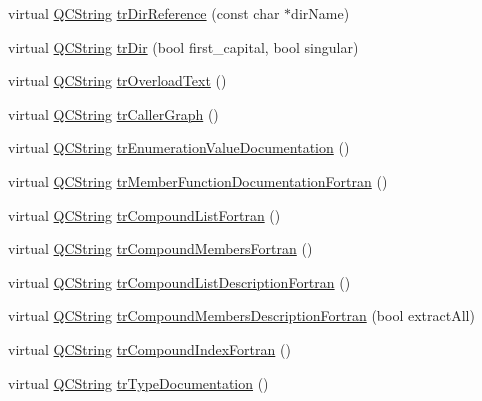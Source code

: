 \begin{DoxyCompactItemize}
\item 
virtual \mbox{\hyperlink{class_q_c_string}{Q\+C\+String}} \mbox{\hyperlink{class_translator_polish_a81612a5c664efbf969a754858f681160}{tr\+Dir\+Reference}} (const char $\ast$dir\+Name)
\item 
virtual \mbox{\hyperlink{class_q_c_string}{Q\+C\+String}} \mbox{\hyperlink{class_translator_polish_afb7f5a136927d3c97c329726db732650}{tr\+Dir}} (bool first\+\_\+capital, bool singular)
\item 
virtual \mbox{\hyperlink{class_q_c_string}{Q\+C\+String}} \mbox{\hyperlink{class_translator_polish_aa85a82b3a60d234fcb2c1b611a190a75}{tr\+Overload\+Text}} ()
\item 
virtual \mbox{\hyperlink{class_q_c_string}{Q\+C\+String}} \mbox{\hyperlink{class_translator_polish_aea28863a3d514eda308c9b6182a684a3}{tr\+Caller\+Graph}} ()
\item 
virtual \mbox{\hyperlink{class_q_c_string}{Q\+C\+String}} \mbox{\hyperlink{class_translator_polish_a4a1891d1aa67f42df654be0c805034f1}{tr\+Enumeration\+Value\+Documentation}} ()
\item 
virtual \mbox{\hyperlink{class_q_c_string}{Q\+C\+String}} \mbox{\hyperlink{class_translator_polish_ab10c6bb79b12175789a3e46fadd2e7a7}{tr\+Member\+Function\+Documentation\+Fortran}} ()
\item 
virtual \mbox{\hyperlink{class_q_c_string}{Q\+C\+String}} \mbox{\hyperlink{class_translator_polish_a7c51709c279dfd97434d2ad5e0dc7ee9}{tr\+Compound\+List\+Fortran}} ()
\item 
virtual \mbox{\hyperlink{class_q_c_string}{Q\+C\+String}} \mbox{\hyperlink{class_translator_polish_abe2ff0a54791739a2d2cc55edaf65f8e}{tr\+Compound\+Members\+Fortran}} ()
\item 
virtual \mbox{\hyperlink{class_q_c_string}{Q\+C\+String}} \mbox{\hyperlink{class_translator_polish_a0eaf14810bf38ced00e900d8b82135a8}{tr\+Compound\+List\+Description\+Fortran}} ()
\item 
virtual \mbox{\hyperlink{class_q_c_string}{Q\+C\+String}} \mbox{\hyperlink{class_translator_polish_a78549d0636c3655e59f8d0c7603cc9ab}{tr\+Compound\+Members\+Description\+Fortran}} (bool extract\+All)
\item 
virtual \mbox{\hyperlink{class_q_c_string}{Q\+C\+String}} \mbox{\hyperlink{class_translator_polish_ac040527acce76d3ae8e644ea6932984a}{tr\+Compound\+Index\+Fortran}} ()
\item 
virtual \mbox{\hyperlink{class_q_c_string}{Q\+C\+String}} \mbox{\hyperlink{class_translator_polish_a73f10fc0ab8af5031abfcb258f040175}{tr\+Type\+Documentation}} ()

\end{DoxyCompactItemize}
